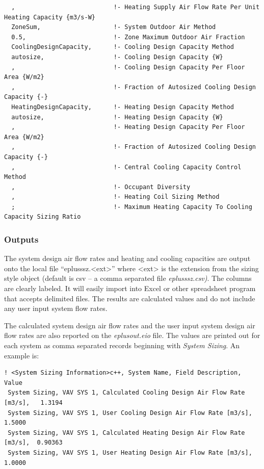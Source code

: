 \begin{lstlisting}
  ,                           !- Heating Supply Air Flow Rate Per Unit Heating Capacity {m3/s-W}
  ZoneSum,                    !- System Outdoor Air Method
  0.5,                        !- Zone Maximum Outdoor Air Fraction
  CoolingDesignCapacity,      !- Cooling Design Capacity Method
  autosize,                   !- Cooling Design Capacity {W}
  ,                           !- Cooling Design Capacity Per Floor Area {W/m2}
  ,                           !- Fraction of Autosized Cooling Design Capacity {-}
  HeatingDesignCapacity,      !- Heating Design Capacity Method
  autosize,                   !- Heating Design Capacity {W}
  ,                           !- Heating Design Capacity Per Floor Area {W/m2}
  ,                           !- Fraction of Autosized Cooling Design Capacity {-}
  ,                           !- Central Cooling Capacity Control Method
  ,                           !- Occupant Diversity
  ,                           !- Heating Coil Sizing Method
  ;                           !- Maximum Heating Capacity To Cooling Capacity Sizing Ratio
\end{lstlisting}

\subsubsection{Outputs}\label{outputs-2-006}

The system design air flow rates and heating and cooling capacities are output onto the local file ``eplusssz.\textless{}ext\textgreater{}'' where \textless{}ext\textgreater{} is the extension from the sizing style object (default is csv -- a comma separated file \emph{eplusssz.csv)}. The columns are clearly labeled. It will easily import into Excel or other spreadsheet program that accepts delimited files. The results are calculated values and do not include any user input system flow rates.

The calculated system design air flow rates and the user input system design air flow rates are also reported on the \emph{eplusout.eio} file. The values are printed out for each system as comma separated records beginning with \emph{System Sizing}. An example is:

\begin{lstlisting}
! <System Sizing Information>c++, System Name, Field Description, Value
 System Sizing, VAV SYS 1, Calculated Cooling Design Air Flow Rate [m3/s],   1.3194
 System Sizing, VAV SYS 1, User Cooling Design Air Flow Rate [m3/s],   1.5000
 System Sizing, VAV SYS 1, Calculated Heating Design Air Flow Rate [m3/s],  0.90363
 System Sizing, VAV SYS 1, User Heating Design Air Flow Rate [m3/s],   1.0000
\end{lstlisting}


